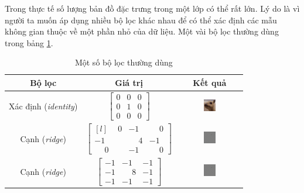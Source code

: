Trong thực tế số lượng bản đồ đặc trưng trong một lớp có thể rất lớn. Lý do là vì người ta muốn áp dụng nhiều bộ lọc khác nhau để có thể xác định các mẫu không gian thuộc về một phần nhỏ của dữ liệu. Một vài bộ lọc thường dùng trong bảng \ref{table:cnn-filters}.
\begin{table}[htb!]
    \centering
    \caption[Một số bộ lọc thường dùng]{Một số bộ lọc thường dùng\footnotemark}
    \label{table:cnn-filters}
    \begin{tabular}{ c c c }
        \toprule
        \textbf{Bộ lọc}              & \textbf{Giá trị}                                                                                                  & \textbf{Kết quả}                                                     \\\midrule
        Xác định (\textit{identity}) & $\begin{bmatrix}0&0&0\\0&1&0\\0&0&0\end{bmatrix}$                                                                 & \includegraphics[width=0.2\textwidth, valign=c]{image/cnn-id.png}    \\\midrule
        Cạnh (\textit{ridge})        & $\begin{bmatrix*}[l]\phantom{-}0&-1&\phantom{-}0\\-1&\phantom{-}4&-1\\\phantom{-}0&-1&\phantom{-}0\end{bmatrix*}$ & \includegraphics[width=0.2\textwidth, valign=c]{image/cnn-ed-1.png}  \\\midrule
        Cạnh (\textit{ridge})        & $\begin{bmatrix*}-1&-1&-1\\-1&\phantom{-}8&-1\\-1&-1&-1\end{bmatrix*}$                                            & \includegraphics[width=0.2\textwidth, valign=c]{image/cnn-ed-2.png}  \\\midrule

\end{tabular}
\end{table}
